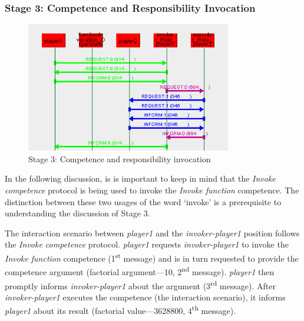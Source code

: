 \subsubsection*{Stage 3: Competence and Responsibility Invocation}

\begin{figure}[H]
	\centering
	\includegraphics[width=0.8\textwidth]{images/examples/example1-stage3.png}
	\caption{Stage 3: Competence and responsibility invocation}
	\label{figure:example1-stage3}
\end{figure}

In the following discussion, is is important to keep in mind that the \textit{Invoke competence} protocol is being used to invoke the \textit{Invoke function} competence.
The distinction between these two usages of the word `invoke' is a prerequisite to understanding the discussion of Stage 3.

The {} interaction scenario between \textit{player1} and the \textit{invoker-player1} position follows the \textit{Invoke competence} protocol.
\textit{player1} requests \textit{invoker-player1} to invoke the \textit{Invoke function} competence (1\textsuperscript{st} message) and is in turn requested to provide the competence argument (factorial argument---10, 2\textsuperscript{nd} message).
\textit{player1} then promptly informs \textit{invoker-player1} about the argument (3\textsuperscript{rd} message).
After \textit{invoker-player1} executes the competence (the {} interaction scenario), it informs \textit{player1} about its result (factorial value---3628800, 4\textsuperscript{th} message).

